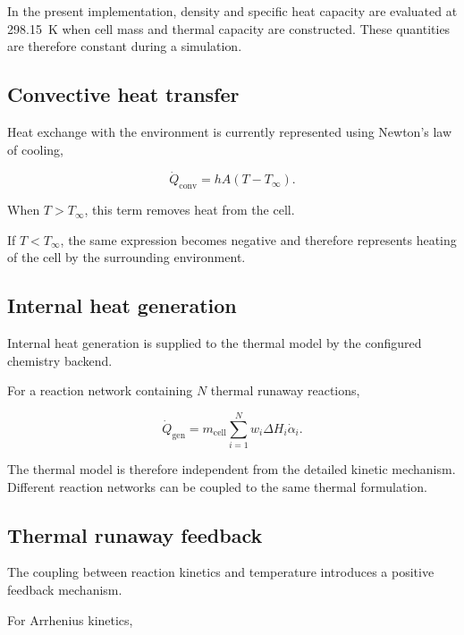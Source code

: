 In the present implementation, density and specific heat capacity are
evaluated at \SI{298.15}{\kelvin} when cell mass and thermal capacity
are constructed. These quantities are therefore constant during a
simulation.


\subsection{Convective heat transfer}

Heat exchange with the environment is currently represented using
Newton's law of cooling,

\begin{equation}
    \dot{Q}_{\mathrm{conv}}
    =
    h A
    \left(
        T - T_{\infty}
    \right).
    \label{eq:convective_heat_loss}
\end{equation}

When $T>T_{\infty}$, this term removes heat from the cell.

If $T<T_{\infty}$, the same expression becomes negative and therefore
represents heating of the cell by the surrounding environment.


\subsection{Internal heat generation}

Internal heat generation is supplied to the thermal model by the
configured chemistry backend.

For a reaction network containing $N$ thermal runaway reactions,

\begin{equation}
    \dot{Q}_{\mathrm{gen}}
    =
    m_{\mathrm{cell}}
    \sum_{i=1}^{N}
    w_i
    \Delta H_i
    \dot{\alpha}_i.
    \label{eq:thermal_reaction_heat}
\end{equation}

The thermal model is therefore independent from the detailed kinetic
mechanism. Different reaction networks can be coupled to the same
thermal formulation.


\subsection{Thermal runaway feedback}

The coupling between reaction kinetics and temperature introduces a
positive feedback mechanism.

For Arrhenius kinetics,

